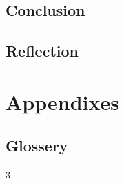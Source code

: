 \begin{multicols}{3}
\chapter{Conclusion}
\chapter{Reflection}



\part{Appendixes}
\chapter{Glossery}

% 
% 

\end{multicols}{3}

